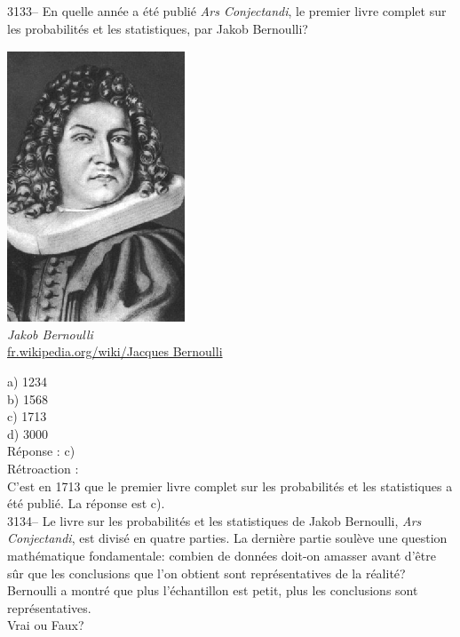 \documentclass[letterpaper, 12pt]{article}
\begin{document}
3133-- En quelle ann\'ee a \'et\'e publi\'e \og \emph{Ars Conjectandi}\fg, le premier livre complet sur les probabilit\'es et les statistiques, par Jakob Bernoulli?
\begin{center}
\includegraphics[scale=0.75]{Jakob_Bernoulli.eps}\\
\emph{{\small Jakob Bernoulli}}\\
\href{http://fr.wikipedia.org/wiki/Jacques_Bernoulli}{fr.wikipedia.org/wiki/Jacques Bernoulli}\\
\end{center}

a) 1234\\
b) 1568\\
c) 1713\\
d) 3000\\

R\'eponse : c)\\

R\'etroaction :\\
C'est en 1713 que le premier livre complet sur les probabilit\'es et les statistiques a \'et\'e publi\'e. La r\'eponse est c).\\



3134-- Le livre sur les probabilit\'es et les statistiques de Jakob Bernoulli, \og \emph{Ars Conjectandi}\fg, est divis\'e en quatre parties. La derni\`ere partie soul\`eve une question math\'ematique fondamentale: combien de donn\'ees doit-on amasser avant d'\^etre s\^ur que les conclusions que l'on obtient sont repr\'esentatives de la r\'ealit\'e? Bernoulli a montr\'e que plus l'\'echantillon est petit, plus les conclusions sont repr\'esentatives.\\
Vrai ou Faux?\\
\end{document}
